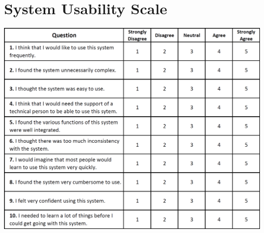 
\appendix
\chapter{System Usability Scale} {
\label{app:system_usability_scale}

	\includegraphics[width=\textwidth]{images/design/sus}




}

